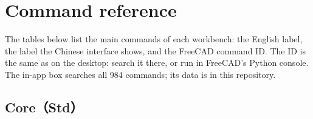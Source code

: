 \chapter{Command reference}

The tables below list the main commands of each workbench: the English label, the label the Chinese interface
shows, and the FreeCAD command ID. The ID is the same as on the desktop: search it there, or run
 in FreeCAD's Python console. The in-app  box searches all 984
commands; its data is  in this repository.

\section{Core（Std）}
